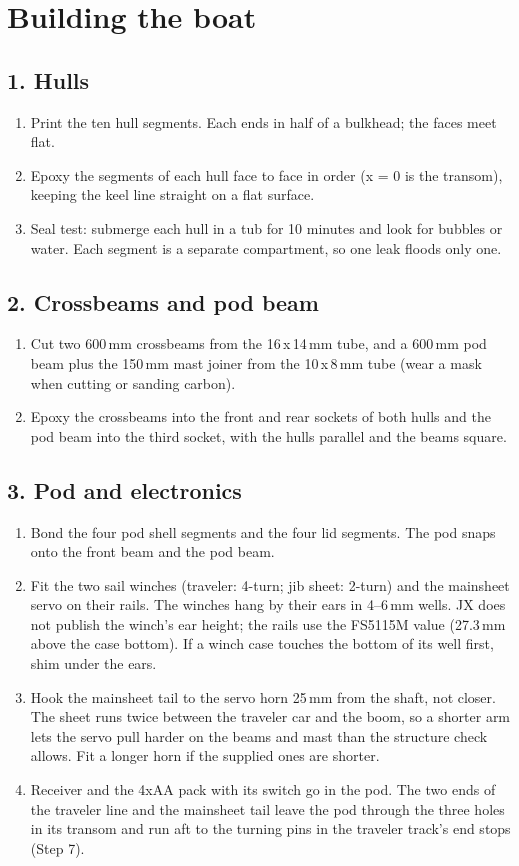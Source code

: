 \documentclass[11pt]{article}
\newcommand{\step}[1]{\subsection*{#1}}
\begin{document}
\section{Building the boat}
\step{1. Hulls}
\begin{enumerate}
\item Print the ten hull segments. Each ends in half of a bulkhead; the faces meet flat.
\item Epoxy the segments of each hull face to face in order (x = 0 is the transom), keeping the keel line straight on a flat surface.
\item Seal test: submerge each hull in a tub for 10 minutes and look for bubbles or water. Each segment is a separate compartment, so one leak floods only one.
\end{enumerate}
\step{2. Crossbeams and pod beam}
\begin{enumerate}
\item Cut two 600\,mm crossbeams from the 16\,x\,14\,mm tube, and a 600\,mm pod beam plus the 150\,mm mast joiner from the 10\,x\,8\,mm tube (wear a mask when cutting or sanding carbon).
\item Epoxy the crossbeams into the front and rear sockets of both hulls and the pod beam into the third socket, with the hulls parallel and the beams square.
\end{enumerate}
\step{3. Pod and electronics}
\begin{enumerate}
\item Bond the four pod shell segments and the four lid segments. The pod snaps onto the front beam and the pod beam.
\item Fit the two sail winches (traveler: 4-turn; jib sheet: 2-turn) and the mainsheet servo on their rails. The winches hang by their ears in 4--6\,mm wells. JX does not publish the winch's ear height; the rails use the FS5115M value (27.3\,mm above the case bottom). If a winch case touches the bottom of its well first, shim under the ears.
\item Hook the mainsheet tail to the servo horn 25\,mm from the shaft, not closer. The sheet runs twice between the traveler car and the boom, so a shorter arm lets the servo pull harder on the beams and mast than the structure check allows. Fit a longer horn if the supplied ones are shorter.
\item Receiver and the 4xAA pack with its switch go in the pod. The two ends of the traveler line and the mainsheet tail leave the pod through the three holes in its transom and run aft to the turning pins in the traveler track's end stops (Step 7).
\end{enumerate}
\end{document}

